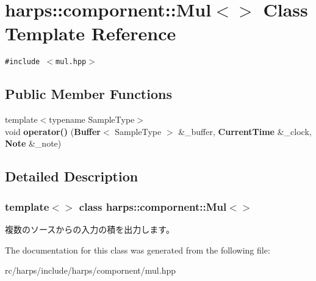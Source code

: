\section{harps::compornent::Mul$<$$>$ Class Template Reference}
\label{classharps_1_1compornent_1_1Mul}
{\tt \#include $<$mul.hpp$>$}

\subsection*{Public Member Functions}
\begin{CompactItemize}
\item 
{\footnotesize template$<$typename SampleType$>$ }\\void \textbf{operator()} ({\bf Buffer}$<$ SampleType $>$ \&\_\-buffer, {\bf CurrentTime} \&\_\-clock, {\bf Note} \&\_\-note)\label{classharps_1_1compornent_1_1Mul_06a25a0fc7e6c36c83ecde2c4bf957dc}

\end{CompactItemize}


\subsection{Detailed Description}
\subsubsection*{template$<$$>$ class harps::compornent::Mul$<$$>$}

複数のソースからの入力の積を出力します。 

The documentation for this class was generated from the following file:\begin{CompactItemize}
\item 
rc/harps/include/harps/compornent/mul.hpp\end{CompactItemize}

